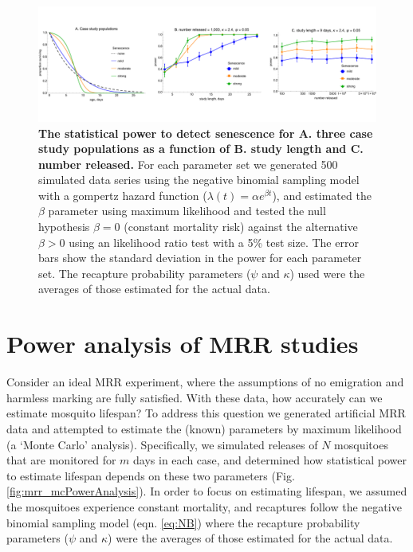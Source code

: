 \documentclass[12pt]{article}
\begin{document}
\begin{figure}[ht]
	\centerline{\includegraphics[width=1.25\textwidth]{./Figure_files/mrr_mcPowerAnalysis_senescence.pdf}}
	\caption{\textbf{The statistical power to detect senescence for A. three case study populations as a function of B. study length and C. number released.} For each parameter set we generated 500 simulated data series using the negative binomial sampling model with a gompertz hazard function ($\lambda(t) = \alpha e^{\beta t}$), and estimated the $\beta$ parameter using maximum likelihood and tested the null hypothesis $\beta=0$ (constant mortality risk) against the alternative $\beta>0$ using an likelihood ratio test with a 5\% test size. The error bars show the standard deviation in the power for each parameter set. The recapture probability parameters ($\psi$ and $\kappa$) used were the averages of those estimated for the actual data.}
	\label{fig:mrr_mcPowerAnalysis_senescence}
\end{figure}

\section{Power analysis of MRR studies}
Consider an ideal MRR experiment, where the assumptions of no emigration and harmless marking are fully satisfied. With these data, how accurately can we estimate mosquito lifespan? To address this question we generated artificial MRR data and attempted to estimate the (known) parameters by maximum likelihood (a `Monte Carlo' analysis). Specifically, we simulated releases of $N$ mosquitoes that are monitored for $m$ days in each case, and determined how statistical power to estimate lifespan depends on these two parameters (Fig. \ref{fig:mrr_mcPowerAnalysis}). In order to focus on estimating lifespan, we assumed the mosquitoes experience constant mortality, and recaptures follow the negative binomial sampling model (eqn. \ref{eq:NB}) where the recapture probability parameters ($\psi$ and $\kappa$) were the averages of those estimated for the actual data.
\end{document}

